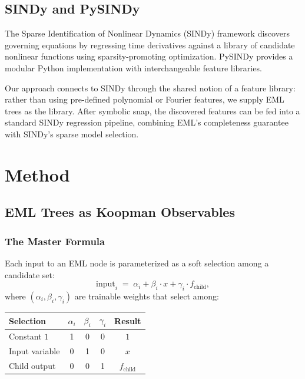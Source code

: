 \documentclass[11pt]{article}
\begin{document}
\subsection{SINDy and PySINDy}
\label{sec:sindy}

The Sparse Identification of Nonlinear Dynamics (SINDy)
framework \citep{brunton2016} discovers governing equations by regressing
time derivatives against a library of candidate nonlinear functions using
sparsity-promoting optimization.  PySINDy \citep{desilva2020,kaptanoglu2022}
provides a modular Python implementation with interchangeable feature libraries.

Our approach connects to SINDy through the shared notion of a feature library:
rather than using pre-defined polynomial or Fourier features, we supply EML trees
as the library.  After symbolic snap, the discovered features can be fed into a
standard SINDy regression pipeline, combining EML's completeness guarantee with
SINDy's sparse model selection.


\section{Method}
\label{sec:method}

\subsection{EML Trees as Koopman Observables}
\label{sec:eml-trees}

\subsubsection{The Master Formula}

Each input to an EML node is parameterized as a soft selection among a candidate
set:
\begin{equation}\label{eq:master}
  \text{input}_i \;=\; \alpha_i + \beta_i \cdot x + \gamma_i \cdot f_{\text{child}},
\end{equation}
where $(\alpha_i, \beta_i, \gamma_i)$ are trainable weights that select among:

\begin{center}
\begin{tabular}{lcccc}
\toprule
Selection & $\alpha_i$ & $\beta_i$ & $\gamma_i$ & Result \\
\midrule
Constant $1$ & 1 & 0 & 0 & $1$ \\
Input variable & 0 & 1 & 0 & $x$ \\
Child output & 0 & 0 & 1 & $f_{\text{child}}$ \\
\bottomrule
\end{tabular}
\end{center}
\end{document}
